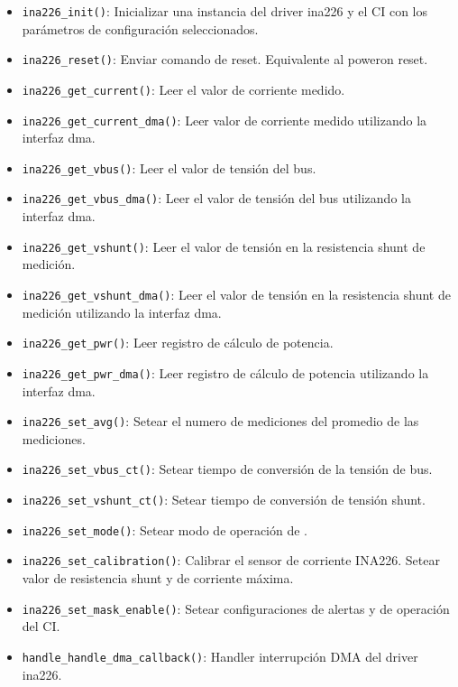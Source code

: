 \documentclass[10pt, a4paper]{article}
\begin{document}
\begin{itemize}
    \item \texttt{ina226\_init()}: Inicializar una instancia del driver ina226 y
        el \acrshort{CI} con los parámetros de configuración seleccionados.
    \item \texttt{ina226\_reset()}: Enviar comando de reset. Equivalente al
        power\textendash on reset.
    \item \texttt{ina226\_get\_current()}: Leer el valor de corriente medido.
    \item \texttt{ina226\_get\_current\_dma()}: Leer valor de corriente medido
        utilizando la interfaz dma.
    \item \texttt{ina226\_get\_vbus()}: Leer el valor de tensión del bus.
    \item \texttt{ina226\_get\_vbus\_dma()}: Leer el valor de tensión del bus
        utilizando la interfaz dma.
    \item \texttt{ina226\_get\_vshunt()}: Leer el valor de tensión en la
        resistencia shunt de medición.
    \item \texttt{ina226\_get\_vshunt\_dma()}: Leer el valor de tensión en la
        resistencia shunt de medición utilizando la interfaz dma.
    \item \texttt{ina226\_get\_pwr()}: Leer registro de cálculo de potencia.
    \item \texttt{ina226\_get\_pwr\_dma()}: Leer registro de cálculo de potencia
        utilizando la interfaz dma.
    \item \texttt{ina226\_set\_avg()}: Setear el numero de mediciones del
        promedio de las mediciones.
    \item \texttt{ina226\_set\_vbus\_ct()}: Setear tiempo de conversión de
        la tensión de bus.
    \item \texttt{ina226\_set\_vshunt\_ct()}: Setear tiempo de conversión de
        tensión shunt.
    \item \texttt{ina226\_set\_mode()}: Setear modo de operación de
        .
    \item \texttt{ina226\_set\_calibration()}: Calibrar el sensor de corriente
        INA226. Setear valor de resistencia shunt y de corriente máxima.
    \item \texttt{ina226\_set\_mask\_enable()}: Setear configuraciones de
        alertas y de operación del \acrshort{CI}.
    \item \texttt{handle\_handle\_dma\_callback()}: Handler interrupción DMA del
        driver ina226.
\end{itemize}
\end{document}
